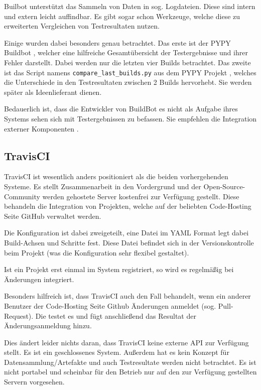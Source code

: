 Builbot unterst\"utzt das Sammeln von Daten in sog. Logdateien.
Diese sind intern und extern leicht auffindbar.
Es gibt sogar schon Werkzeuge, welche diese zu erweiterten Vergleichen von Testresultaten nutzen.

Einige wurden dabei besonders genau betrachtet.
Das erste ist der PYPY Buildbot \cite{pypy:overview}, welcher eine hilfreiche Gesamtübersicht der Testergebnisse und ihrer Fehler darstellt.
Dabei werden nur die letzten vier Builds betrachtet.
Das zweite ist das Script namens \verb|compare_last_builds.py|
aus dem PYPY Projekt \cite{pypy:diffscript} ,
welches die Unterschiede in den Testresultaten zwischen 2 Builds hervorhebt.
Sie werden sp\"ater als Ideenlieferant dienen.

Bedauerlich ist, dass die Entwickler von BuildBot es nicht als Aufgabe ihres Systems sehen
sich mit Testergebnissen zu befassen.
Sie empfehlen die Integration externer Komponenten \cite{buildbot:irc}.

\subsection{TravisCI}


TravisCI \cite{travisci:website} ist wesentlich anders positioniert als die beiden vorhergehenden Systeme.
Es stellt Zusammenarbeit in den Vordergrund und der Open-Source-Community werden gehostete Server
kostenfrei zur Verf\"ugung gestellt.
Diese behandeln die Integration von Projekten,
welche auf der beliebten Code-Hosting Seite GitHub verwaltet werden.

Die Konfiguration ist dabei zweigeteilt,
eine Datei im \ac{YAML} Format \cite{yaml:website} legt dabei Build-Achsen und Schritte fest.
Diese Datei befindet sich in der Versionskontrolle beim Projekt
(was die Konfiguration sehr flexibel gestaltet).

Ist ein Projekt erst einmal im System registriert,
so wird es regelmäßig bei Änderungen integriert.

Besonders hilfreich ist, dass TravisCI auch den Fall behandelt,
wenn ein anderer Benutzer der Code-Hosting Seite Github \"Anderungen anmeldet
\cite{github:pullreq} (sog. Pull-Request).
Die testet es und f\"ugt anschließend das Resultat der \"Anderungsanmeldung hinzu.

Dies \"andert leider nichts daran, dass TravisCI keine externe API zur Verfügung stellt.
Es ist ein geschlossenes System. Außerdem hat es kein Konzept f\"ur Datensammlung/Artefakte
und auch Testresultate werden nicht betrachtet.
Es ist nicht portabel und scheinbar f\"ur den Betrieb nur
auf den zur Verfügung gestellten Servern vorgesehen.


